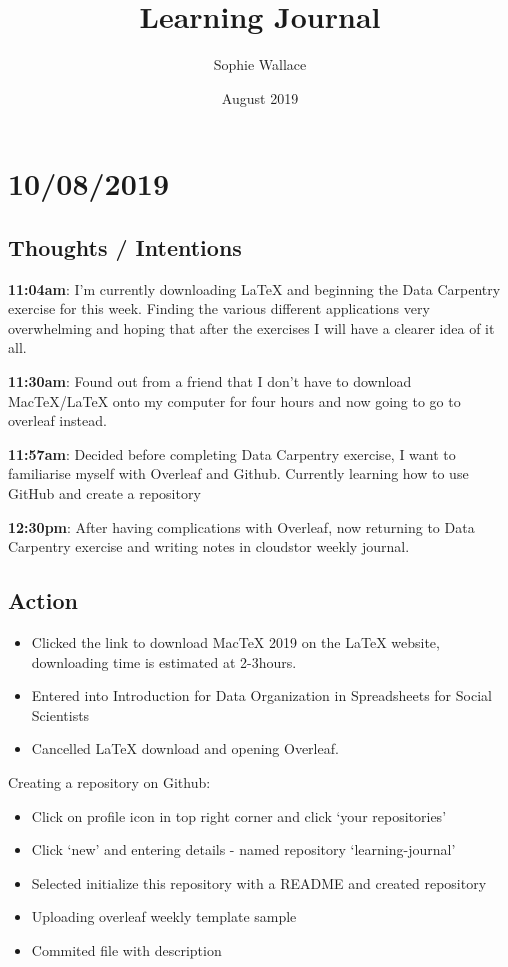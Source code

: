 \documentclass{article}
\title{Learning Journal}
\author{Sophie Wallace }
\date{August 2019}
\begin{document}
\maketitle

\section{10/08/2019}
\subsection{Thoughts / Intentions}

\textbf{11:04am}: I’m currently downloading LaTeX and beginning the Data Carpentry exercise for this week. Finding the various different applications very overwhelming and hoping that after the exercises I will have a clearer idea of it all. 


\textbf{11:30am}: Found out from a friend that I don’t have to download MacTeX/LaTeX onto my computer for four hours and now going to go to overleaf instead. 


\textbf{11:57am}: Decided before completing Data Carpentry exercise, I want to familiarise myself with Overleaf and Github. Currently learning how to use GitHub and create a repository 


\textbf{12:30pm}: After having complications with Overleaf, now returning to Data Carpentry exercise and writing notes in cloudstor weekly journal. 

\subsection{Action}

\begin{itemize}
\item Clicked the link to download MacTeX 2019 on the LaTeX website, downloading time is estimated at 2-3hours. 
\item Entered into Introduction for Data Organization in Spreadsheets for Social Scientists
\item Cancelled LaTeX download and opening Overleaf. 
\end{itemize}



Creating a repository on Github:

\begin{itemize}
\item Click on profile icon in top right corner and click ‘your repositories’
\item Click ‘new’ and entering details - named repository ‘learning-journal’
\item Selected initialize this repository with a README and created repository
\item Uploading overleaf weekly template sample
\item Commited file with description
\end{itemize}
 
\end{document}
